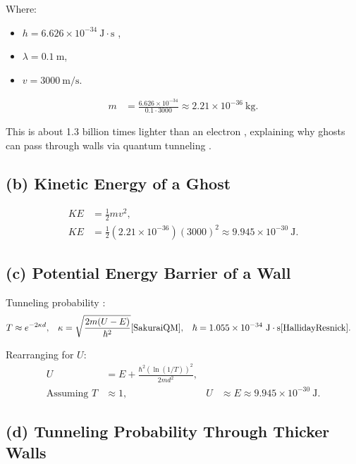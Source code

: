 \documentclass[10pt,a4paper]{article}
\begin{document}
Where:
\begin{itemize}
    \item $h = 6.626 \times 10^{-34}~\mathrm{J\cdot s}$ \cite{HallidayResnick},
    \item $\lambda = 0.1~\mathrm{m}$,
    \item $v = 3000~\mathrm{m/s}$.
\end{itemize}

\begin{align}
m &= \frac{6.626 \times 10^{-34}}{0.1 \cdot 3000} \approx 2.21 \times 10^{-36}~\mathrm{kg}.
\end{align}

This is about 1.3 billion times lighter than an electron \cite{HallidayResnick}, explaining why ghosts can pass through walls via quantum tunneling \cite{GriffithsQM}.

\vspace{2mm}
\subsection*{(b) Kinetic Energy of a Ghost}

\begin{align}
KE &= \frac{1}{2} m v^2, \\
KE &= \frac{1}{2} (2.21 \times 10^{-36}) (3000)^2 \approx 9.945 \times 10^{-30}~\mathrm{J}.
\end{align}

\vspace{2mm}
\subsection*{(c) Potential Energy Barrier of a Wall}

Tunneling probability \cite{GriffithsQM}:
\begin{align}
T &\approx e^{-2 \kappa d}, &
\kappa &= \sqrt{\frac{2 m (U - E)}{\hbar^2}} \cite{SakuraiQM}, &
\hbar &= 1.055 \times 10^{-34}~\mathrm{J\cdot s} \cite{HallidayResnick}.
\end{align}

Rearranging for $U$:
\begin{align}
U &= E + \frac{\hbar^2 (\ln(1/T))^2}{2 m d^2}, \\
\text{Assuming } T &\approx 1, & U &\approx E \approx 9.945 \times 10^{-30}~\mathrm{J}.
\end{align}

\vspace{2mm}
\subsection*{(d) Tunneling Probability Through Thicker Walls}
\end{document}

